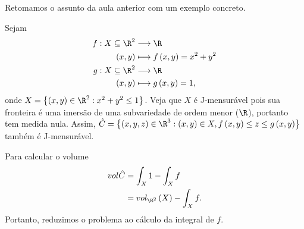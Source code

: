 
Retomamos o assunto da aula anterior com um exemplo concreto.

\begin{eg}
    Sejam
    \begin{align*}
        f: X\subseteq\R^{2} &\longrightarrow \R \\
        \left( x,y \right)  &\longmapsto f\left( x,y \right)  = x^2+y^2 \\
        g: X\subseteq\R^2 &\longrightarrow \R \\
        \left( x,y \right)  &\longmapsto g\left( x,y \right)  = 1
    ,\end{align*}
    onde $X = \left\{ \left( x,y \right) \in \R^{2} : x^2+y^2\le 1 \right\} $. Veja que $X$ é J-mensurável pois sua fronteira é uma imersão de uma subvariedade de ordem menor ($\R$), portanto tem medida nula. Assim, $\hat{C} = \left\{ \left( x,y,z \right) \in \R^3 : \left( x,y \right) \in X, f\left( x,y \right) \le z\le g\left( x,y \right)  \right\}$ também é J-mensurável.

    Para calcular o volume
    \begin{align*}
	vol \hat{C} &= \int_X 1 - \int_X f \\
	&= vol_{\R^2}\left( X \right) - \int_X f
    .\end{align*}
    Portanto, reduzimos o problema ao cálculo da integral de $f$.


\end{eg}
